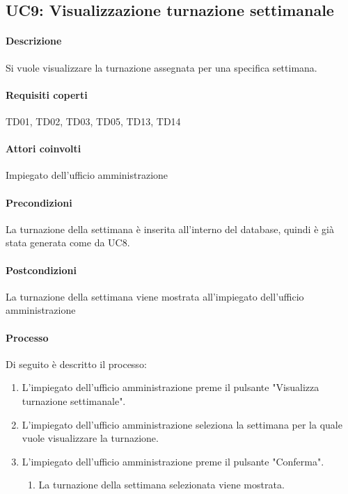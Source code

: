 \subsection{UC9: Visualizzazione turnazione settimanale}
\paragraph{Descrizione}
Si vuole visualizzare la turnazione assegnata per una specifica settimana.
\paragraph{Requisiti coperti}
TD01, TD02, TD03, TD05, TD13, TD14
\paragraph{Attori coinvolti}
Impiegato dell'ufficio amministrazione
\paragraph{Precondizioni}
La turnazione della settimana è inserita all'interno del database, quindi è già stata generata come da UC8.
\paragraph{Postcondizioni}
La turnazione della settimana viene mostrata all'impiegato dell'ufficio amministrazione
\paragraph{Processo}
Di seguito è descritto il processo:
\begin{enumerate}
	\item L'impiegato dell'ufficio amministrazione preme il pulsante "Visualizza turnazione settimanale".
	\item L'impiegato dell'ufficio amministrazione seleziona la settimana per la quale vuole visualizzare la turnazione.
	\item L'impiegato dell'ufficio amministrazione preme il pulsante "Conferma".
		\begin{enumerate}
			\item La turnazione della settimana selezionata viene mostrata.
		\end{enumerate}
\end{enumerate}
